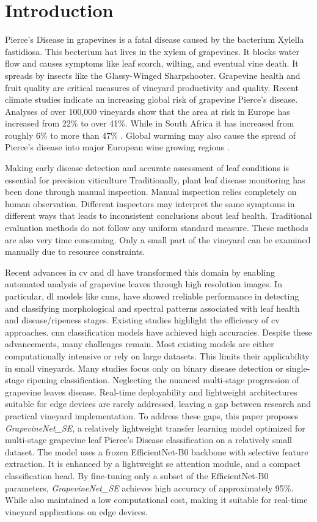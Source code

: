 \documentclass[conference]{IEEEtran}
\begin{document}
\section{Introduction}
Pierce's Disease in grapevines is a fatal disease caused by the bacterium Xylella fastidiosa. This becterium hat lives in the xylem of grapevines. It blocks water flow and causes symptoms like leaf scorch, wilting, and eventual vine death. It spreads by insects like the Glassy-Winged Sharpshooter. Grapevine health and fruit quality are critical measures of vineyard productivity and quality. 
Recent climate studies indicate an increasing global risk of grapevine Pierce’s disease. Analyses of over 100,000 vineyards show that the area at risk in Europe has increased from 22\% to over 41\%. While in South Africa it has increased from roughly 6\% to more than 47\% \cite{GimenezRomero2025}. Global warming may also cause the spread of Pierce’s disease  into major European wine growing regions \cite{GimenezRomero2024}.

Making early disease detection and accurate assessment of leaf conditions is essential for precision viticulture Traditionally, plant leaf disease monitoring has been done through manual inspection. Manual inspection relies completely on human observation. Different inspectors may interpret the same symptoms in different ways that leads to inconsistent conclusions about leaf health. Traditional evaluation methods do not follow any uniform standard measure. These methods are also very time consuming. Only a small part of the vineyard can be examined manually due to resource constraints.

Recent advances in \ac{cv} and \ac{dl} have transformed this domain by enabling automated analysis of grapevine leaves through high resolution images. In particular, \ac{dl} models like \ac{cnn}s, have showed rreliable performance in detecting and classifying morphological and spectral patterns associated with leaf health and disease/ripeness stages. Existing studies highlight the efficiency of \ac{cv} approaches. \ac{cnn} classification models have achieved high accuracies.  Despite these advancements, many challenges remain. Most existing models are either computationally intensive or rely on large datasets. This limits their applicability in small vineyards. Many studies focus only on binary disease detection or single-stage ripening classification. Neglecting the nuanced multi-stage progression of grapevine leaves disease. Real-time deployability and lightweight architectures suitable for edge devices are rarely addressed, leaving a gap between research and practical vineyard implementation. To address these gaps, this paper proposes \textit{GrapevineNet\_SE}, a relatively lightweight transfer learning model optimized for multi-stage grapevine leaf Pierce's Disease classification on a relatively small dataset. The model uses a frozen EfficientNet-B0 backbone with selective feature extraction. It is enhanced by a lightweight \ac{se} attention module, and a compact classification head. By fine-tuning only a subset of the EfficientNet-B0 parameters, \textit{GrapevineNet\_SE} achieves high accuracy of approximately 95\%. While  also maintained a low computational cost, making it suitable for real-time vineyard applications on edge devices.
\end{document}
